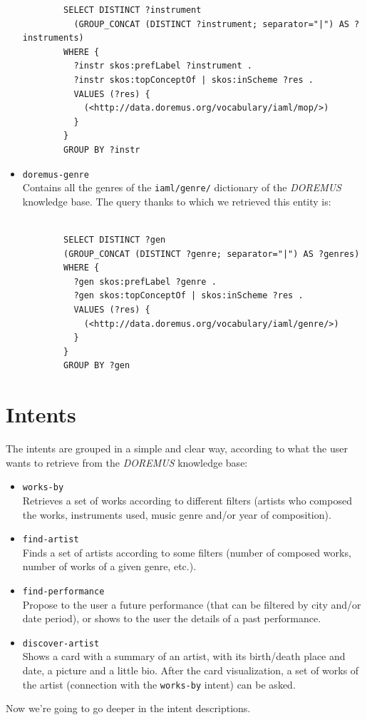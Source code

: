 \documentclass[a4paper,12pt]{report}
\begin{document}
\begin{itemize}
\begin{lstlisting}
		SELECT DISTINCT ?instrument
		  (GROUP_CONCAT (DISTINCT ?instrument; separator="|") AS ?instruments)
		WHERE {
		  ?instr skos:prefLabel ?instrument .
		  ?instr skos:topConceptOf | skos:inScheme ?res .
		  VALUES (?res) {
		    (<http://data.doremus.org/vocabulary/iaml/mop/>)
		  }
		}
		GROUP BY ?instr
		\end{lstlisting}
		
		\item \texttt{doremus-genre}\\
		Contains all the genres of the \texttt{iaml/genre/} dictionary of the \textit{DOREMUS} knowledge base. The query thanks to which we retrieved this entity is:
		\begin{lstlisting}
		
		SELECT DISTINCT ?gen
		(GROUP_CONCAT (DISTINCT ?genre; separator="|") AS ?genres)
		WHERE {
		  ?gen skos:prefLabel ?genre .
		  ?gen skos:topConceptOf | skos:inScheme ?res .
		  VALUES (?res) {
		    (<http://data.doremus.org/vocabulary/iaml/genre/>)
		  }
		}
		GROUP BY ?gen
		\end{lstlisting}
	\end{itemize}

	\section{Intents}
	The intents are grouped in a simple and clear way, according to what the user wants to retrieve from the \textit{DOREMUS} knowledge base:
	\begin{itemize}
		\item \texttt{works-by}\\
		Retrieves a set of works according to different filters (artists who composed the works, instruments used, music genre and/or year of composition).
		\item \texttt{find-artist}\\
		Finds a set of artists according to some filters (number of composed works, number of works of a given genre, etc.).
		\item \texttt{find-performance}\\
		Propose to the user a future performance (that can be filtered by city and/or date period), or shows to the user the details of a past performance.
		\item \texttt{discover-artist}\\
		Shows a card with a summary of an artist, with its birth/death place and date, a picture and a little bio. After the card visualization, a set of works of the artist (connection with the \texttt{works-by} intent) can be asked.
	\end{itemize}
	Now we're going to go deeper in the intent descriptions.
\end{document}

